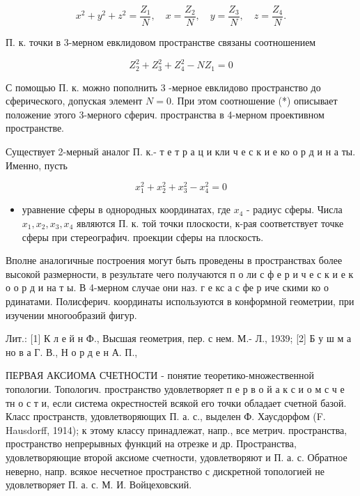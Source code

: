 \documentclass[10pt]{article}
\begin{document}
\[

x^{2}+y^{2}+z^{2}=\frac{Z_{1}}{N}, \quad x=\frac{Z_{2}}{N}, \quad y=\frac{Z_{3}}{N}, \quad z=\frac{Z_{4}}{N} .

\]



П. к. точки в 3-мерном евклидовом пространстве связаны соотношением



\[

Z_{2}^{2}+Z_{3}^{2}+Z_{4}^{2}-N Z_{1}=0

\]



С помощью П. к. можно пополнить 3 -мерное евклидово пространство до сферического, допуская элемент $N=0$. При этом соотношение (*) описывает положение этого 3-мерного сферич. пространства в 4-мерном проективном пространстве.



Существует 2-мерный аналог П. к.- т е т р а ц и кли ч е с к и е ко о р д и н а ты. Именно, пусть



\[

x_{1}^{2}+x_{2}^{2}+x_{3}^{2}-x_{4}^{2}=0

\]



\begin{itemize}

  \item уравнение сферы в однородных координатах, где $x_{4}$ - радиус сферы. Числа $x_{1}, x_{2}, x_{3}, x_{4}$ являются П. к. той точки плоскости, к-рая соответствует точке сферы при стереографич. проекции сферы на плоскость.

\end{itemize}



Вполне аналогичные построения могут быть проведены в пространствах более высокой размерности, в результате чего получаются п о ли с ф е р и ч е с к и е к о о р д и на т ы. В 4-мерном случае они наз. г е кс а с фе р иче скими ко о рдинатами. Полисферич. координаты используются в конформной геометрии, при изучении многообразий фигур.



Лит.: [1] К л е й н Ф., Высшая геометрия, пер. с нем. М.- Л., 1939; [2] Б у ш м а но в а Г. В., Н о р д е н А. П.,



ПЕРВАЯ АКСИОМА СЧЕТНОСТИ - понятие теоретико-множественной топологии. Топологич. пространство удовлетворяет п е р в о й а к с и о м с ч е тн о с т и, если система окрестностей всякой его точки обладает счетной базой. Класс пространств, удовлетворяющих П. а. с., выделен Ф. Хаусдорфом (F. Hausdorff, 1914); к этому классу принадлежат, напр., все метрич. пространства, пространство непрерывных функций на отрезке и др. Пространства, удовлетворяющие второй аксиоме счетности, удовлетворяют и П. а. с. Обратное неверно, напр. всякое несчетное пространство с дискретной топологией не удовлетворяет П. а. с. М. И. Войцеховский.
\end{document}
